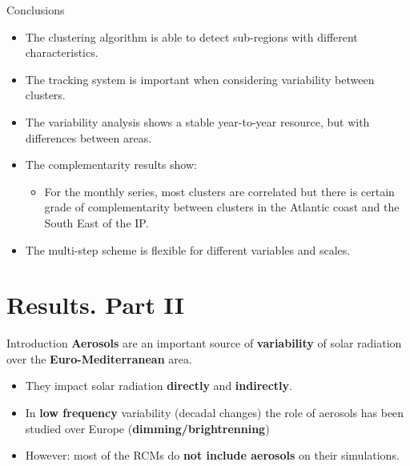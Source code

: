 \documentclass{beamer}%
\begin{document}
\begin{frame}[fragile]{Conclusions}
    \begin{itemize}
    \item<1->  The clustering algorithm is able to detect sub-regions with different characteristics.
    \item <2->The tracking system is important when considering variability between clusters.
    \item <3->The variability analysis shows a stable year-to-year resource, but with differences between areas.
    \item <4->The complementarity results show:
      \begin{itemize}
      \item For the monthly series, most clusters are correlated but there is certain grade of complementarity between clusters in the Atlantic coast and the South East of the IP.
      \end{itemize}
    \item <5->The multi-step scheme is flexible for different variables and scales.  
    \end{itemize}
\end{frame}

\section{Results. Part II}


\begin{frame}[standout]
\end{frame}

\begin{frame}[fragile]{Introduction}
\textbf{\alert{Aerosols}} are an important source of \textbf{variability} of solar radiation over the \textbf{Euro-Mediterranean} area. 
\small{  \begin{itemize}
\item<2->  They impact solar radiation \textbf{directly} and \textbf{indirectly}.
\item<2->  In \textbf{low frequency} variability (decadal changes) the role of aerosols has been studied over Europe (\textbf{dimming/brightrenning}) 
\item<2->  However: most of the RCMs do \textbf{not include aerosols} on their simulations.
\end{itemize}}
\end{frame}
\end{document}
